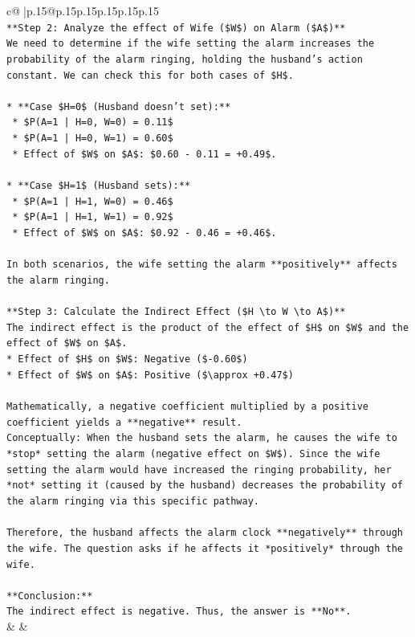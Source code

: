 \documentclass{article}
\begin{document}
{\begin{supertabular}{c@{$\;$}|p{.15\linewidth}@{}p{.15\linewidth}p{.15\linewidth}p{.15\linewidth}p{.15\linewidth}p{.15\linewidth}}
{{{\\ 
\texttt{**Step 2: Analyze the effect of Wife (\$W\$) on Alarm (\$A\$)**} \\
\texttt{We need to determine if the wife setting the alarm increases the probability of the alarm ringing, holding the husband's action constant. We can check this for both cases of \$H\$.} \\
\\ 
\texttt{*   **Case \$H=0\$ (Husband doesn't set):**} \\
\texttt{    *   \$P(A=1 | H=0, W=0) = 0.11\$} \\
\texttt{    *   \$P(A=1 | H=0, W=1) = 0.60\$} \\
\texttt{    *   Effect of \$W\$ on \$A\$: \$0.60 {-} 0.11 = +0.49\$.} \\
\\ 
\texttt{*   **Case \$H=1\$ (Husband sets):**} \\
\texttt{    *   \$P(A=1 | H=1, W=0) = 0.46\$} \\
\texttt{    *   \$P(A=1 | H=1, W=1) = 0.92\$} \\
\texttt{    *   Effect of \$W\$ on \$A\$: \$0.92 {-} 0.46 = +0.46\$.} \\
\\ 
\texttt{In both scenarios, the wife setting the alarm **positively** affects the alarm ringing.} \\
\\ 
\texttt{**Step 3: Calculate the Indirect Effect (\$H \textbackslash{}to W \textbackslash{}to A\$)**} \\
\texttt{The indirect effect is the product of the effect of \$H\$ on \$W\$ and the effect of \$W\$ on \$A\$.} \\
\texttt{*   Effect of \$H\$ on \$W\$: Negative (\${-}0.60\$)} \\
\texttt{*   Effect of \$W\$ on \$A\$: Positive (\$\textbackslash{}approx +0.47\$)} \\
\\ 
\texttt{Mathematically, a negative coefficient multiplied by a positive coefficient yields a **negative** result.} \\
\texttt{Conceptually: When the husband sets the alarm, he causes the wife to *stop* setting the alarm (negative effect on \$W\$). Since the wife setting the alarm would have increased the ringing probability, her *not* setting it (caused by the husband) decreases the probability of the alarm ringing via this specific pathway.} \\
\\ 
\texttt{Therefore, the husband affects the alarm clock **negatively** through the wife. The question asks if he affects it *positively* through the wife.} \\
\\ 
\texttt{**Conclusion:**} \\
\texttt{The indirect effect is negative. Thus, the answer is **No**.} \\
            }
        }
    }
    & & \\ \\


\end{supertabular}}
\end{document}
